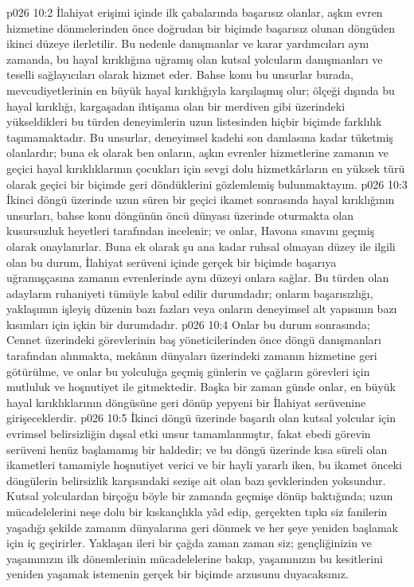 \vs p026 10:2 İlahiyat erişimi içinde ilk çabalarında başarısız olanlar, aşkın evren hizmetine dönmelerinden önce doğrudan bir biçimde başarısız olunan döngüden ikinci düzeye ilerletilir. Bu nedenle danışmanlar ve karar yardımcıları aynı zamanda, bu hayal kırıklığına uğramış olan kutsal yolcuların danışmanları ve teselli sağlayıcıları olarak hizmet eder. Bahse konu bu unsurlar burada, mevcudiyetlerinin en büyük hayal kırıklığıyla karşılaşmış olur; ölçeği dışında bu hayal kırıklığı, kargaşadan ihtişama olan bir merdiven gibi üzerindeki yükseldikleri bu türden deneyimlerin uzun listesinden hiçbir biçimde farklılık taşımamaktadır. Bu unsurlar, deneyimsel kadehi son damlasına kadar tüketmiş olanlardır; buna ek olarak ben onların, aşkın evrenler hizmetlerine zamanın ve geçici hayal kırıklıklarının çocukları için sevgi dolu hizmetkârların en yüksek türü olarak geçici bir biçimde geri döndüklerini gözlemlemiş bulunmaktayım.
\vs p026 10:3 İkinci döngü üzerinde uzun süren bir geçici ikamet sonrasında hayal kırıklığının unsurları, bahse konu döngünün öncü dünyası üzerinde oturmakta olan kusursuzluk heyetleri tarafından incelenir; ve onlar, Havona sınavını geçmiş olarak onaylanırlar. Buna ek olarak şu ana kadar ruhsal olmayan düzey ile ilgili olan bu durum, İlahiyat serüveni içinde gerçek bir biçimde başarıya uğramışçasına zamanın evrenlerinde aynı düzeyi onlara sağlar. Bu türden olan adayların ruhaniyeti tümüyle kabul edilir durumdadır; onların başarısızlığı, yaklaşımın işleyiş düzenin bazı fazları veya onların deneyimsel alt yapısının bazı kısımları için içkin bir durumdadır.
\vs p026 10:4 Onlar bu durum sonrasında; Cennet üzerindeki görevlerinin baş yöneticilerinden önce döngü danışmanları tarafından alınmakta, mekânın dünyaları üzerindeki zamanın hizmetine geri götürülme, ve onlar bu yolculuğa geçmiş günlerin ve çağların görevleri için mutluluk ve hoşnutiyet ile gitmektedir. Başka bir zaman günde onlar, en büyük hayal kırıklıklarının döngüsüne geri dönüp yepyeni bir İlahiyat serüvenine girişeceklerdir.
\vs p026 10:5 İkinci döngü üzerinde başarılı olan kutsal yolcular için evrimsel belirsizliğin dışsal etki unsur tamamlanmıştır, fakat ebedi görevin serüveni henüz başlamamış bir haldedir; ve bu döngü üzerinde kısa süreli olan ikametleri tamamiyle hoşnutiyet verici ve bir hayli yararlı iken, bu ikamet önceki döngülerin belirsizlik karşısındaki sezişe ait olan bazı şevklerinden yoksundur. Kutsal yolculardan birçoğu böyle bir zamanda geçmişe dönüp baktığında; uzun mücadelelerini neşe dolu bir kıskançlıkla yâd edip, gerçekten tıpkı siz fanilerin yaşadığı şekilde zamanın dünyalarına geri dönmek ve her şeye yeniden başlamak için iç geçirirler. Yaklaşan ileri bir çağda zaman zaman siz; gençliğinizin ve yaşamınızın ilk dönemlerinin mücadelelerine bakıp, yaşamınızın bu kesitlerini yeniden yaşamak istemenin gerçek bir biçimde arzusunu duyacaksınız.
